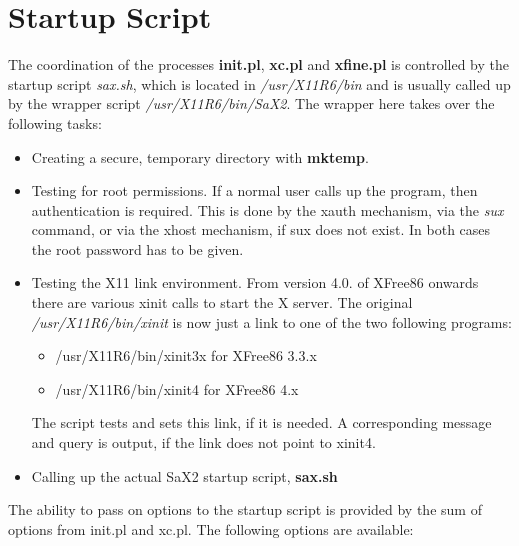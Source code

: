\section{Startup Script}
\label{sec:sta}
The coordination of the processes \textbf{init.pl}, \textbf{xc.pl}
and \textbf{xfine.pl} is controlled by the startup script \textit{sax.sh}, 
which is located in \textit{/usr/X11R6/bin} and is usually called up by the 
wrapper script \textit{/usr/X11R6/bin/SaX2}. The wrapper here takes over the
following tasks:
\begin{itemize}
\item Creating a secure, temporary directory with \textbf{mktemp}. 
\item Testing for root permissions. If a normal user calls up the program,
  then authentication is required. This is done by the xauth mechanism, via
  the  \textit{sux} command, or via the xhost mechanism, if sux does not
  exist. In both cases the root password has to be given.  
\item Testing the X11 link environment. From version 4.0. of XFree86 onwards
  there are various xinit calls to start the X server. The original
  \textit{/usr/X11R6/bin/xinit} is now just a link to one of the two following
  programs:
      \begin{itemize}
      \item /usr/X11R6/bin/xinit3x for XFree86 3.3.x
      \item /usr/X11R6/bin/xinit4  for XFree86 4.x
      \end{itemize} 
      The script tests and sets this link, if it is needed. A corresponding
      message and query is output, if the link does not point to xinit4. 
\item Calling up the actual SaX2 startup script, \textbf{sax.sh}
\end{itemize}
The ability to pass on options to the startup script is provided by the sum of
options from init.pl and xc.pl.
The following options are available:
